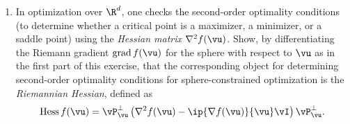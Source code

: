 \documentclass[../../book-main.tex]{subfiles}
\begin{document}
\begin{exercise}
\begin{enumerate}
\begin{equation}
        \mathrm{grad}\, f(\vu) = \vP_{\vu}^\perp \nabla f
        \end{equation}
        is known as the \textit{Riemannian gradient} of the function $f$ restricted to the sphere.
        The \textit{first order optimality conditions} for the optimization problem \eqref{eq:exercise-sphere-constrained-max} can be expressed in terms of the Riemann gradient:
        \begin{equation*}
            \mathrm{grad}\, f(\vu) = \mathbf{0}.
        \end{equation*}
        Geometrically, this says that the Euclidean gradient of $f$ at $\vu$ must be orthogonal to the tangent space to the sphere at $\vu$.
        Now suppose $\vv \in \R^d$ is nonzero. Show that
        \begin{equation*}
            \mathrm{proj}_{\bS^{d-1}}(\vv) :=
            \min_{\norm{\vu}_2^2 = 1}\, \norm{\vu - \vv}_2 
            =
            \frac{\vv}{\norm{\vv}_2},
        \end{equation*}
        using the first-order optimality conditions. 
        \item In optimization over $\R^d$, one checks the second-order optimality conditions (to determine whether a critical point is a maximizer, a minimizer, or a saddle point) using the \textit{Hessian matrix} $\nabla^2 f(\vu)$.
        Show, by differentiating the Riemann gradient $\mathrm{grad}\, f(\vu)$ for the sphere with respect to $\vu$ as in the first part of this exercise, that the corresponding object for determining second-order optimality conditions for sphere-constrained optimization is the \textit{Riemannian Hessian}, defined as
        \begin{equation}\label{eq:exercise-riemann-hess-sphere}
            \mathrm{Hess}\, f(\vu) = \vP_{\vu}^\perp \left( 
            \nabla^2 f(\vu) - \ip{\nabla f(\vu)}{\vu} \vI
            \right) \vP_{\vu}^\perp.
        \end{equation}
    \end{enumerate}
\end{exercise}
\end{document}
